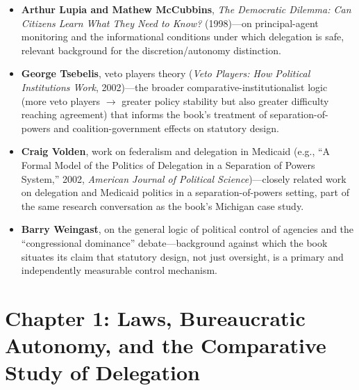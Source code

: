 \documentclass[12pt]{article}
\begin{document}
\begin{itemize}[leftmargin=*, itemsep=4pt]
    \item \textbf{Arthur Lupia and Mathew McCubbins}, \textit{The Democratic Dilemma: Can Citizens Learn What They Need to Know?} (1998)---on principal-agent monitoring and the informational conditions under which delegation is safe, relevant background for the discretion/autonomy distinction.
    \item \textbf{George Tsebelis}, veto players theory (\textit{Veto Players: How Political Institutions Work}, 2002)---the broader comparative-institutionalist logic (more veto players $\to$ greater policy stability but also greater difficulty reaching agreement) that informs the book's treatment of separation-of-powers and coalition-government effects on statutory design.
    \item \textbf{Craig Volden}, work on federalism and delegation in Medicaid (e.g., ``A Formal Model of the Politics of Delegation in a Separation of Powers System,'' 2002, \textit{American Journal of Political Science})---closely related work on delegation and Medicaid politics in a separation-of-powers setting, part of the same research conversation as the book's Michigan case study.
    \item \textbf{Barry Weingast}, on the general logic of political control of agencies and the ``congressional dominance'' debate---background against which the book situates its claim that statutory design, not just oversight, is a primary and independently measurable control mechanism.
\end{itemize}

\section{Chapter 1: Laws, Bureaucratic Autonomy, and the Comparative Study of Delegation}
\end{document}
